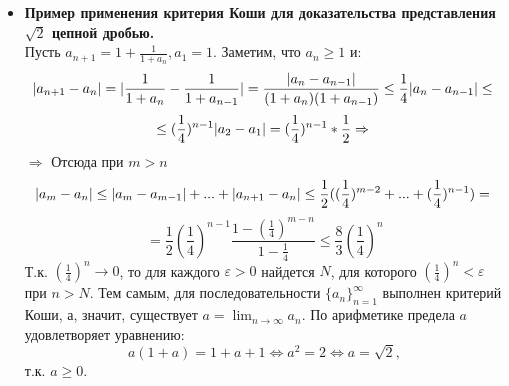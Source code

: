 \documentclass[12pt,a4paper]{article}
\begin{document}
\begin{itemize}
\item \textbf{Пример применения критерия Коши для доказательства представления $\sqrt2$ цепной дробью.} \\
Пусть $a_{n+1} = 1 + \frac{1}{1+a_n}, a_1 = 1$. Заметим, что $a_n \geq 1$ и:
\[
|a_{n+1} - a_n| = |\frac{1}{1 + a_n} - \frac{1}{1 + a_{n-1}}| = \frac{|a_n - a_{n-1}|}{(1+a_n)(1+a_{n-1})} \leq \frac{1}{4} |a_n - a_{n-1}| \leq \\
\]
\[
\leq (\frac{1}{4})^{n-1} |a_2 - a_1| = (\frac{1}{4})^{n-1}*\frac{1}{2} \Rightarrow \\
\]
$\Rightarrow$ Отсюда при $m > n$ \\
\[
|a_m - a_n| \leq |a_m - a_{m-1}| + ... + |a_{n+1} - a_n| \leq \frac{1}{2} ((\frac{1}{4})^{m-2} + ... + (\frac{1}{4})^{n-1}) = \\
\]
\[
= \frac{1}{2}(\frac{1}{4})^{n-1} \frac{1 - (\frac{1}{4})^{m - n}}{1 - \frac{1}{4}} \leq \frac{8}{3}(\frac{1}{4})^n
\]
Т.к. $(\frac{1}{4})^n \longrightarrow 0$, то для каждого $\varepsilon > 0$ найдется $N$, для которого $(\frac{1}{4})^n < \varepsilon$ при $n > N$. Тем самым, для последовательности $\{a_n\}_{n=1}^{\infty}$ выполнен критерий Коши, а, значит, существует $a = \lim_{n \to \infty}{a_n}$. По арифметике предела $a$ удовлетворяет уравнению: \[a(1+a) = 1 + a +1 \Leftrightarrow a^2 = 2 \Leftrightarrow a = \sqrt2,\]
т.к. $a \geq 0$.
\end{itemize}
\end{document}
